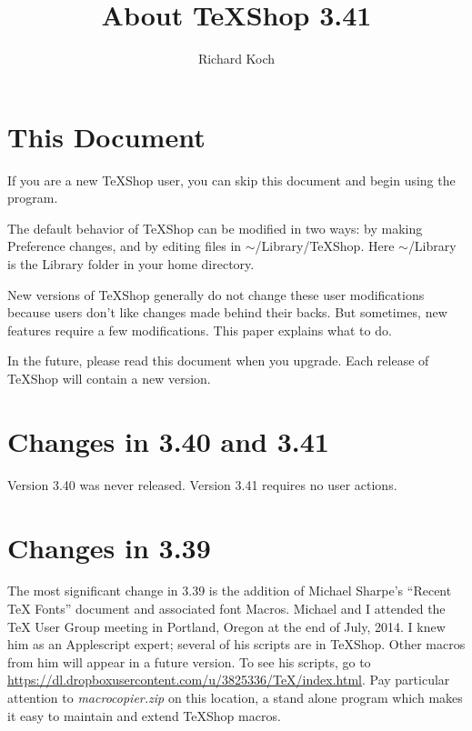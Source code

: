 \documentclass[11pt, oneside]{amsart}
\title{About TeXShop 3.41}
\author{Richard Koch}
\begin{document}
\maketitle

\thispagestyle{empty}
\vspace{-.3in}
\section{This Document}

If you are a new TeXShop user, you can skip this document and begin using the program.

The default behavior of TeXShop can be modified in two ways: by making Preference changes, and by editing files in $\sim$/Library/TeXShop. Here $\sim$/Library is the Library folder in your home directory. 

New versions of TeXShop generally do not change these user modifications because users don't like changes made behind their backs. But sometimes, new features require a few modifications. This paper explains what to do.

In the future, please read this document when you upgrade. Each release of TeXShop will contain a new version.

\section{Changes in 3.40 and 3.41}

Version 3.40 was never released. Version 3.41 requires no user actions.

\section{Changes in 3.39}

The most significant change in 3.39 is the addition of Michael Sharpe's ``Recent TeX Fonts'' document and associated font Macros.  Michael and I attended the TeX User Group meeting in Portland, Oregon at the end of July, 2014. I knew him as an Applescript expert; several of his scripts are in TeXShop. Other macros from him will appear in a future version. To see his scripts, go to 
\url{https://dl.dropboxusercontent.com/u/3825336/TeX/index.html}. Pay particular attention to 
{\em macrocopier.zip} on this location, a stand alone program which makes it easy to maintain and extend TeXShop macros.
\end{document}
